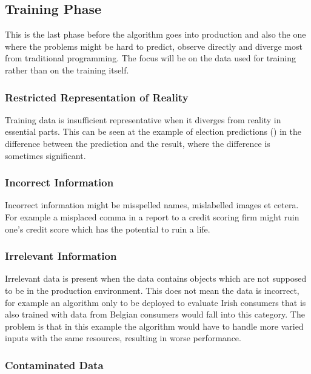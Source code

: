\subsection{Training Phase}
This is the last phase before the algorithm goes into production and also the one where the problems might be hard to predict, observe directly and diverge most from traditional programming. The focus will be on the data used for training rather than on the training itself.

\subsubsection{Restricted Representation of Reality}

Training data is insufficient representative when it diverges from reality in essential parts. This can be seen at the example of election predictions (\cite{2016}) in the difference between the prediction and the result, where the difference is sometimes significant.

\subsubsection{Incorrect Information}

Incorrect information might be misspelled names, mislabelled images et cetera. For example a misplaced comma in a report to a credit scoring firm might ruin one's credit score which has the potential to ruin a life.

\subsubsection{Irrelevant Information}

Irrelevant data is present when the data contains 
objects which are not supposed to be in the production 
environment. This does not mean the data is incorrect,
for example an algorithm only to be deployed to evaluate
Irish consumers that is also trained with data from 
Belgian consumers would fall into this category.
The problem is that in this example the algorithm
would have to handle more varied inputs with the same resources, resulting
in worse performance.

\subsubsection{Contaminated Data}


